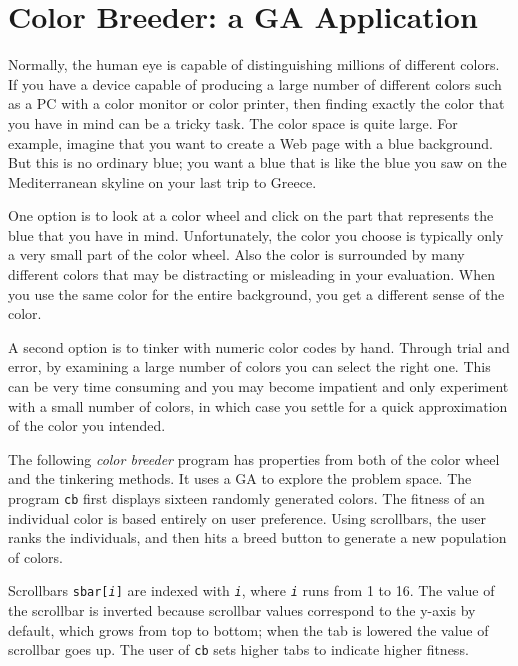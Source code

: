 \section{Color Breeder: a GA Application}

Normally, the human eye is capable of distinguishing millions of
different colors. If you have a device capable of producing a large
number of different colors such as a PC with a color monitor or color
printer, then finding exactly the color that you have in mind can be a
tricky task. The color space is quite large. For example, imagine that
you want to create a Web page with a blue background. But this is no
ordinary blue; you want a blue that is like the blue you saw on the
Mediterranean skyline on your last trip to Greece.

One option is to look at a color wheel and click on the part that
represents the blue that you have in mind. Unfortunately,
the color you choose is typically only a very small part of the
color wheel. Also the color is surrounded by many different colors that
may be distracting or misleading in your evaluation. When you use the
same color for the entire background, you get a different sense of the
color.

A second option is to tinker with numeric color codes by hand. Through
trial and error, by examining a large number of colors you can select
the right one. This can be very time consuming and you may become
impatient and only experiment with a small number of colors, in which
case you settle for a quick approximation of the color you intended.

The following \textit{color breeder} program has properties from both of
the color wheel and the tinkering methods. It uses a GA to explore the
problem space. The program \texttt{cb} first displays sixteen randomly
generated colors. The fitness of an individual color is based entirely
on user preference. Using scrollbars, the user ranks the individuals,
and then hits a breed button to generate a new population of colors.

Scrollbars \texttt{sbar[\textit{i}]} are indexed with
\texttt{\textit{i}}, where \texttt{\textit{i}} runs from 1 to
16. The value of the scrollbar is inverted because scrollbar values
correspond to the y-axis by default, which grows from top to bottom;
when the tab is lowered the value of scrollbar goes up. The user of
\texttt{cb} sets higher tabs to indicate higher fitness.


